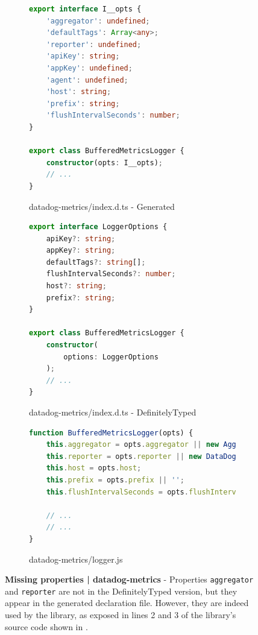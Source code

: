 \documentclass[a4paper,english,cleveref, autoref]{lipics-v2019}
\begin{document}
\begin{figure}[tp]
    \centering
    \begin{subfigure}{0.48\linewidth}
      \begin{lstlisting}[language=TypeScript]
export interface I__opts {
    'aggregator': undefined;
    'defaultTags': Array<any>;
    'reporter': undefined;
    'apiKey': string;
    'appKey': undefined;
    'agent': undefined;
    'host': string;
    'prefix': string;
    'flushIntervalSeconds': number;
}

export class BufferedMetricsLogger {
    constructor(opts: I__opts);
    // ...
}
      \end{lstlisting}
      \caption{datadog-metrics/index.d.ts - Generated}
    \end{subfigure}
    \hfill
    \begin{subfigure}{0.48\linewidth}
      \begin{lstlisting}[language=TypeScript]
export interface LoggerOptions {
    apiKey?: string;
    appKey?: string;
    defaultTags?: string[];
    flushIntervalSeconds?: number;
    host?: string;
    prefix?: string;
}

export class BufferedMetricsLogger {
    constructor(
        options: LoggerOptions
    );
    // ...
}
      \end{lstlisting}
      \caption{datadog-metrics/index.d.ts - DefinitelyTyped}
    \end{subfigure}

    \begin{subfigure}{0.80\linewidth}
        \begin{lstlisting}[language=TypeScript]
function BufferedMetricsLogger(opts) {
    this.aggregator = opts.aggregator || new Aggregator(opts.defaultTags);
    this.reporter = opts.reporter || new DataDogReporter(opts.apiKey, opts.appKey, opts.agent);
    this.host = opts.host;
    this.prefix = opts.prefix || '';
    this.flushIntervalSeconds = opts.flushIntervalSeconds;

    // ...
    // ...
}
        \end{lstlisting}
        \caption{datadog-metrics/logger.js}
        \label{fig:subfloat-datadog-logger}
      \end{subfigure}

    \caption{\textbf{Missing properties | datadog-metrics} - Properties \texttt{aggregator} and \texttt{reporter} are not in the DefinitelyTyped version, but they appear in the generated declaration file. However, they are indeed used by the library, as exposed in lines 2 and 3 of the library's source code shown in \protect{}.}
    \label{fig:experiments-results-module-datadog-metrics}
\end{figure}
\end{document}
